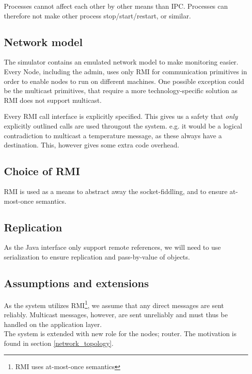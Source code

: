 \documentclass[10pt,a4paper]{article}
\begin{document}
Processes cannot affect each other by other means than IPC. Processes can therefore not make other process stop/start/restart, or similar.

\subsection{Network model}
The simulator contains an emulated network model to make monitoring easier. Every Node, including the admin, uses only RMI for communication primitives in order to enable nodes to run on different machines.
One possible exception could be the multicast primitives, that require a more technology-specific solution as RMI does not support multicast.

Every RMI call interface is explicitly specified. This gives us a safety that \emph{only} explicitly outlined calls are used througout the system. e.g. it would be a logical contradiction to multicast a temperature message, as these always have a destination. This, however gives some extra code overhead.

\subsection{Choice of RMI}
RMI is used as a means to abstract away the socket-fiddling, and to ensure at-most-once semantics.

\subsection{Replication}
As the Java interface  only support remote references, we will need to use serialization to ensure replication and pass-by-value of objects.

\subsection{Assumptions and extensions}
As the system utilizes RMI\footnote{RMI uses at-most-once semantics}, we assume that any direct messages are sent reliably. Multicast messages, however, are sent unreliably and must thus be handled on the application layer.\\

The system is extended with new role for the nodes; router. The motivation is found in section \ref{network_topology}.
\end{document}
